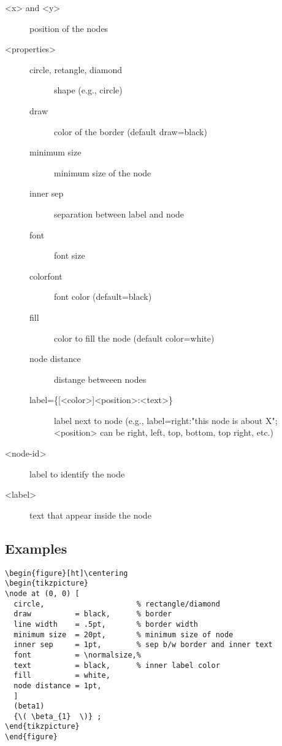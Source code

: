 \documentclass[a4paper]{article}
\begin{document}
\begin{description}
\item[{\color{red} <x> \color{black} and \color{red} <y> \color{black}}] position of the nodes
\item[{\color{red} <properties> \color{black}}] \begin{description}
\item[{circle, retangle, diamond}] shape (e.g., circle)
\item[{draw         }] color of the border (default draw=black)
\item[{minimum size }] minimum size of the node
\item[{inner sep    }] separation between label and node
\item[{font         }] font size
\item[{colorfont    }] font color (default=black)
\item[{fill         }] color to fill the node (default color=white)
\item[{node distance}] distange betweeen nodes
\item[{label=\{[<color>]<position>:\normalsize<text>\}        }] label next to node (e.g., label=right:"this node is about X"; <position> can be right, left, top, bottom, top right, etc.)
\end{description}
\item[{\color{red} <node-id> \color{black}}] label to identify the node
\item[{\color{red} <label> \color{black}}] text that appear inside the node
\end{description}

\subsection{Examples}
\label{sec:orgfea1b55}
\lstset{numbers=left,language=[LaTeX]TeX,label= ,caption= ,captionpos=b}
\begin{lstlisting}
\begin{figure}[ht]\centering
\begin{tikzpicture}
\node at (0, 0) [
  circle,                     % rectangle/diamond
  draw          = black,      % border
  line width    = .5pt,       % border width
  minimum size  = 20pt,       % minimum size of node
  inner sep     = 1pt,        % sep b/w border and inner text
  font          = \normalsize,%
  text          = black,      % inner label color
  fill          = white,
  node distance = 1pt,
  ]
  (beta1)
  {\( \beta_{1}  \)} ;
\end{tikzpicture}
\end{figure}
\end{lstlisting}
\end{document}
